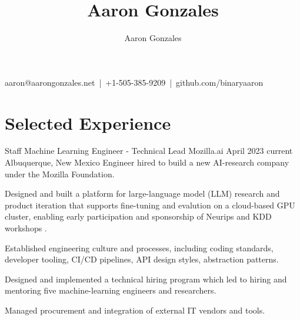 \documentclass[print]{ag-cv} %
\title{Aaron Gonzales}
\author{Aaron Gonzales}
\makeatletter
\renewcommand\maketitle{
{\raggedright %
{aaron@aarongonzales.net~|~+1-505-385-9209~|~github.com/binaryaaron}\\
\vspace{3mm}
{\headingfont \bfseries \@title }
}
} %
\makeatother
\begin{document}
\pagestyle{fancy} %
\fancyhf{}
\fancyhead{}
\fancyfoot{}
\cfoot{}
\renewcommand{\headrulewidth}{0pt}
\renewcommand{\footrulewidth}{0pt}
\maketitle

\raggedright
\section*{Selected Experience}

\begin{job}
  {Staff Machine Learning Engineer - Technical Lead} 
  {Mozilla.ai}
  {April 2023}
  {current}
  {Albuquerque, New Mexico}
  {
  Engineer hired to build a new AI-research company under the Mozilla Foundation.
  }
{
  \begin{myitemize}
    \item Designed and built a platform for large-language model (LLM) research
    and product iteration that supports fine-tuning and evalution on a cloud-based GPU cluster, enabling early
    participation and sponsorship of Neurips and KDD workshops \autocite{kdd_2023_workshop,neurips_llm_efficiency_2023}. 
    \item Established engineering culture and processes, including coding
    standards, developer tooling, CI/CD pipelines, API design styles,
    abstraction patterns.
    \item Designed and implemented a technical hiring program which led to hiring and mentoring five machine-learning engineers and researchers. 
    \item Managed procurement and integration of external IT vendors and tools.
  \end{myitemize}
}
\end{job}
\end{document}
